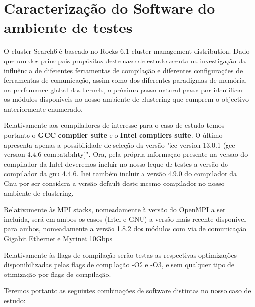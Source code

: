 \documentclass[conference,compsoc]{IEEEtran}
\begin{document}
\section{Caracterização do Software do ambiente de testes}




O cluster Search6 é baseado no Rocks 6.1 cluster management distribution. 
Dado que  um dos principais propósitos deste caso de estudo acenta na investigação da influência de diferentes ferramentas de compilação e diferentes configurações de ferramentas de comunicação, assim como dos diferentes paradigmas de memória, na perfomance global dos kernels, o próximo passo natural passa por identificar os módulos disponíveis no nosso ambiente de clustering que cumprem o objectivo anteriormente enumerado. \par 
Relativamente aos compiladores de interesse para o caso de estudo temos portanto o \textbf{GCC compiler suite}	e o \textbf{ Intel compilers suite}. O último apresenta apenas a possibilidade de seleção da versão "icc version 13.0.1 (gcc version 4.4.6 compatibility)". Ora, pela própria informação presente na versão do compilador da Intel deveremos incluir no nosso leque de testes a versão do compilador da gnu 4.4.6. Irei também incluir a versão 4.9.0 do compilador da Gnu por ser considera a versão default deste mesmo compilador no nosso ambiente de clustering.\par 
Relativamente às MPI stacks, nomeadamente à versão do OpenMPI a ser incluída, será em ambos os casos (Intel e GNU) a versão mais recente disponível para ambos, nomeadamente a versão 1.8.2 dos módulos com via de comunicação Gigabit Ethernet e Myrinet 10Gbps.\par 
Relativamente às flags de compilação serão testas as respectivas optimizações disponibilizadas pelas flags de compilação -O2 e -O3, e sem qualquer tipo de otimização por flags de compilação.\par 
Teremos portanto as seguintes combinações de software distintas no nosso caso de estudo:
\end{document}
